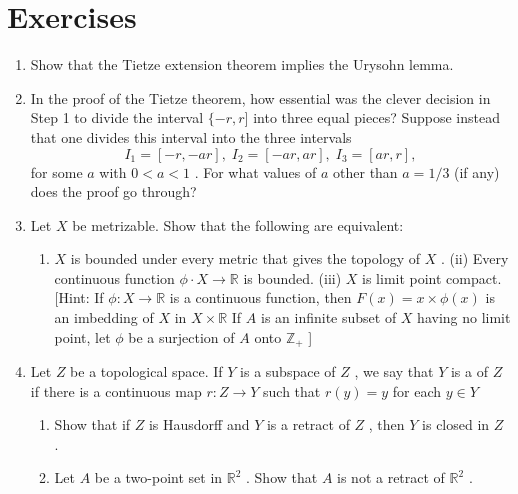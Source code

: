 \section*{Exercises}
\begin{enumerate}[itemsep=0.4em, parsep=0pt, topsep=0pt, partopsep=0pt, leftmargin=*, label=\arabic*., ref=\arabic*]
\item Show that the Tietze extension theorem implies the Urysohn lemma.
\item In the proof of the Tietze theorem, how essential was the clever decision in Step 1 to divide the interval \(\{  - r,r\rbrack\) into three equal pieces? Suppose instead that one divides this interval into the three intervals \[ {I}_{1} = \left\lbrack  {-r, - {ar}}\right\rbrack  ,\;{I}_{2} = \left\lbrack  {-{ar},{ar}}\right\rbrack  ,\;{I}_{3} = \left\lbrack  {{ar},r}\right\rbrack  , \] for some \(a\) with \(0 < a < 1\) . For what values of \(a\) other than \(a = 1/3\) (if any) does the proof go through?
\item Let \(X\) be metrizable. Show that the following are equivalent:
  \begin{enumerate}[itemsep=0.2em, parsep=0pt, topsep=0pt, partopsep=0pt, leftmargin=*, label=(\alph*), align=left]
  \item \(X\) is bounded under every metric that gives the topology of \(X\) . (ii) Every continuous function \(\phi  \cdot  X \rightarrow  \mathbb{R}\) is bounded. (iii) \(X\) is limit point compact. [Hint: If \(\phi  : X \rightarrow  \mathbb{R}\) is a continuous function, then \(F\left( x\right)  = x \times  \phi \left( x\right)\) is an imbedding of \(X\) in \(X \times  \mathbb{R}\) If \(A\) is an infinite subset of \(X\) having no limit point, let \(\phi\) be a surjection of \(A\) onto \({\mathbb{Z}}_{ + }\) ]
  \end{enumerate}
\item Let \(Z\) be a topological space. If \(Y\) is a subspace of \(Z\) , we say that \(Y\) is a  of \(Z\) if there is a continuous map \(r : Z \rightarrow  Y\) such that \(r\left( y\right)  = y\) for each \(y \in  Y\)
  \begin{enumerate}[itemsep=0.2em, parsep=0pt, topsep=0pt, partopsep=0pt, leftmargin=*, label=(\alph*), align=left]
  \item Show that if \(Z\) is Hausdorff and \(Y\) is a retract of \(Z\) , then \(Y\) is closed in \(Z\) .
  \item Let \(A\) be a two-point set in \({\mathbb{R}}^{2}\) . Show that \(A\) is not a retract of \({\mathbb{R}}^{2}\) .

\end{enumerate}
\end{enumerate}
